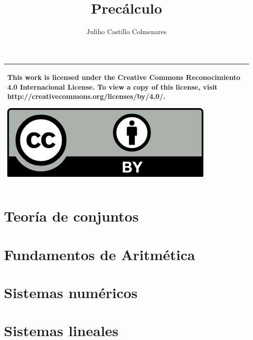 \documentclass[
]{tufte-book}
\title{Precálculo}
\author{Juliho Castillo Colmenares}
\begin{document}
	\maketitle
\begin{tabular}{|p{}|}
	\hline
	This work is licensed under the Creative Commons Reconocimiento 4.0 Internacional License. To view a copy of this license, visit
	http://creativecommons.org/licenses/by/4.0/.
	\begin{center}
		\includegraphics[scale=1]{./licencia/by.png}
	\end{center}\\
	\hline
\end{tabular}
\tableofcontents

\chapter{Teoría de conjuntos}



 





 





\chapter{Fundamentos de Aritmética}







\chapter{Sistemas numéricos}





\chapter{Sistemas lineales}




\end{document}
